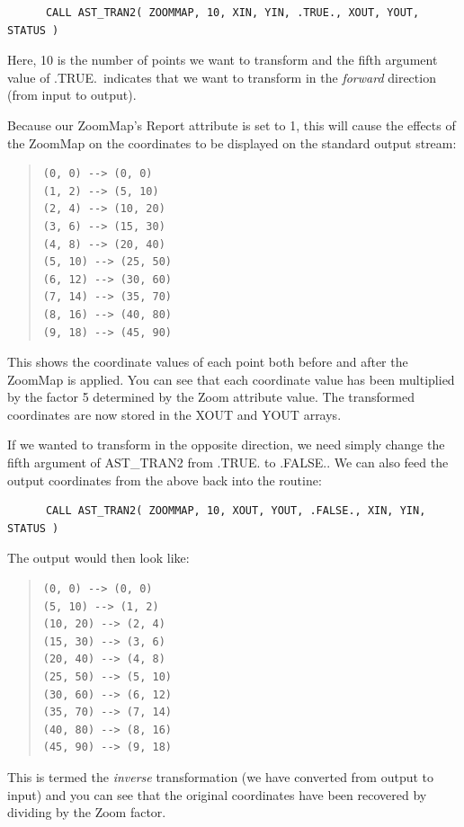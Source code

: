 \documentclass[twoside,11pt]{article}
\newcommand{\htmlref}[2]{#1}
\begin{document}
\small
\begin{verbatim}
      CALL AST_TRAN2( ZOOMMAP, 10, XIN, YIN, .TRUE., XOUT, YOUT, STATUS )
\end{verbatim}
\normalsize

Here, 10 is the number of points we want to transform and the fifth
argument value of .TRUE.\ indicates that we want to transform in the
{\em{forward}} direction (from input to output).

Because our ZoomMap's Report attribute is set to 1, this will cause
the effects of the ZoomMap on the coordinates to be displayed on the
standard output stream:

\begin{quote}
\small
\begin{verbatim}
(0, 0) --> (0, 0)
(1, 2) --> (5, 10)
(2, 4) --> (10, 20)
(3, 6) --> (15, 30)
(4, 8) --> (20, 40)
(5, 10) --> (25, 50)
(6, 12) --> (30, 60)
(7, 14) --> (35, 70)
(8, 16) --> (40, 80)
(9, 18) --> (45, 90)
\end{verbatim}
\normalsize
\end{quote}

This shows the coordinate values of each point both before and after
the ZoomMap is applied. You can see that each coordinate value has
been multiplied by the factor 5 determined by the \htmlref{Zoom}{Zoom} attribute
value. The transformed coordinates are now stored in the XOUT and YOUT
arrays.

If we wanted to transform in the opposite direction, we need simply
change the fifth argument of AST\_TRAN2 from .TRUE. to .FALSE.. We can
also feed the output coordinates from the above back into the routine:

\small
\begin{verbatim}
      CALL AST_TRAN2( ZOOMMAP, 10, XOUT, YOUT, .FALSE., XIN, YIN, STATUS )
\end{verbatim}
\normalsize

The output would then look like:

\begin{quote}
\small
\begin{verbatim}
(0, 0) --> (0, 0)
(5, 10) --> (1, 2)
(10, 20) --> (2, 4)
(15, 30) --> (3, 6)
(20, 40) --> (4, 8)
(25, 50) --> (5, 10)
(30, 60) --> (6, 12)
(35, 70) --> (7, 14)
(40, 80) --> (8, 16)
(45, 90) --> (9, 18)
\end{verbatim}
\normalsize
\end{quote}

This is termed the {\em{inverse}} transformation (we have converted
from output to input) and you can see that the original coordinates
have been recovered by dividing by the Zoom factor.
\end{document}
